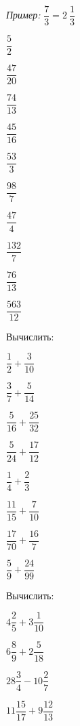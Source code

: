 \begin{class}[number=1]
\begin{listofex}
		\textit{Пример:} \( \dfrac{7}{3}=2\:\dfrac{1}{3} \)
		\begin{enumcols}[itemcolumns=5]
			\item \( \dfrac{5}{2} \)
			\item \( \dfrac{47}{20} \)
			\item \( \dfrac{74}{13} \)
			\item \( \dfrac{45}{16} \)
			\item \( \dfrac{53}{3} \)
			\item \( \dfrac{98}{7} \)
			\item \( \dfrac{47}{4} \)
			\item \( \dfrac{132}{7} \)
			\item \( \dfrac{76}{13} \)
			\item \( \dfrac{563}{12} \)
		\end{enumcols}
		\item Вычислить:
		\begin{enumcols}[itemcolumns=4]
			\item \( \dfrac{1}{2}+\dfrac{3}{10} \)
			\item \( \dfrac{3}{7}+\dfrac{5}{14} \)
			\item \( \dfrac{5}{16}+\dfrac{25}{32} \)
			\item \( \dfrac{5}{24}+\dfrac{17}{12} \)
			\item \( \dfrac{1}{4}+\dfrac{2}{3} \)
			\item \( \dfrac{11}{15}+\dfrac{7}{10} \)
			\item \( \dfrac{17}{70}+\dfrac{16}{7} \)
			\item \( \dfrac{5}{9}+\dfrac{24}{99} \)
		\end{enumcols}
		\item Вычислить:
		\begin{enumcols}[itemcolumns=4]
			\item \( 4\dfrac{2}{5}+3\dfrac{1}{10} \)
			\item \( 6\dfrac{8}{9}+2\dfrac{5}{18} \)
			\item \( 28\dfrac{3}{4}-10\dfrac{2}{7} \)
			\item \( 11\dfrac{15}{17}+9\dfrac{12}{13} \)
		\end{enumcols}
	\end{listofex}
\end{class}
